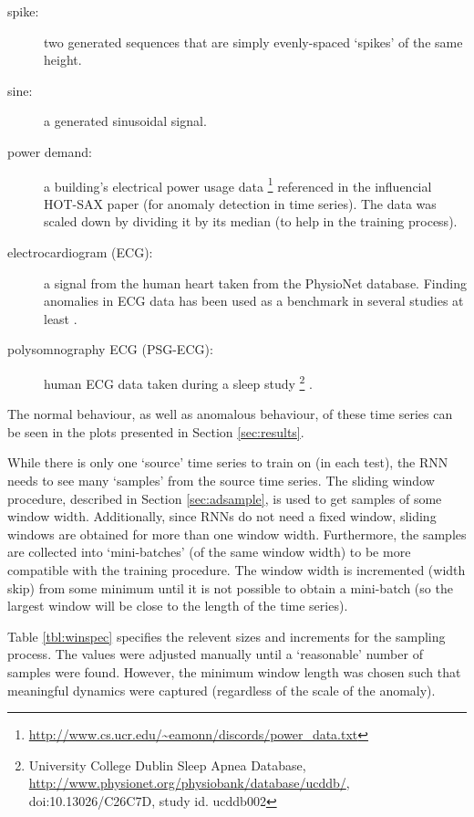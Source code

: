 \begin{description}

\item[spike:] two generated sequences that are simply evenly-spaced `spikes' of the same height.

\item[sine:] a generated sinusoidal signal.

\item[power demand:] a building's electrical power usage data%
\footnote{\url{http://www.cs.ucr.edu/~eamonn/discords/power_data.txt}} referenced in the influencial HOT-SAX paper \cite{Keogh2005} (for anomaly detection in time series). The data was scaled down by dividing it by its median (to help in the training process).

\item[electrocardiogram  (ECG):] a signal from the human heart taken from the PhysioNet \cite{PhysioNet} database. Finding anomalies in ECG data has been used as a benchmark in several studies at least \cite{Malhotra2015,Keogh2005,Cheboli2010,li2012dimensionality,Wei2005,Chuah2007,Jones2014}.

\item[polysomnography ECG (PSG-ECG):] human ECG data \cite{PhysioNet} taken during a sleep study%
\footnote{University College Dublin Sleep Apnea Database, \url{http://www.physionet.org/physiobank/database/ucddb/}, doi:10.13026/C26C7D, study id. ucddb002}%
.


\end{description}
\noindent
%
The normal behaviour, as well as anomalous behaviour, of these time series can be seen in the plots presented in Section \ref{sec:results}.%

While there is only one `source' time series to train on (in each test), the RNN needs to see many `samples' from the source time series.
%
The sliding window procedure, described in Section \ref{sec:adsample}, is used to get samples of some window width.
%
Additionally, since RNNs do not need a fixed window, sliding windows are obtained for more than one window width.
%
Furthermore, the samples are collected into `mini-batches' (of the same window width) to be more compatible with the training procedure.
%
The window width is incremented (width skip) from some minimum until it is not possible to obtain a mini-batch (so the largest window will be close to the length of the time series).


Table \ref{tbl:winspec} specifies the relevent sizes and increments for the sampling process.
%
The values were adjusted manually until a `reasonable' number of samples were found.
%
However, the minimum window length was chosen such that meaningful dynamics were captured (regardless of the scale of the anomaly).

